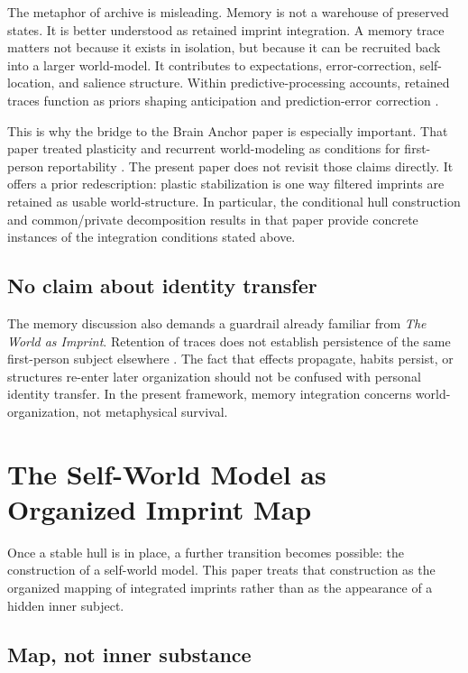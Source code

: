 \documentclass[12pt]{article}
\begin{document}
The metaphor of archive is misleading. Memory is not a warehouse of preserved states. It is better understood as retained imprint integration. A memory trace matters not because it exists in isolation, but because it can be recruited back into a larger world-model. It contributes to expectations, error-correction, self-location, and salience structure. Within predictive-processing accounts, retained traces function as priors shaping anticipation and prediction-error correction \cite{Clark2013}.

This is why the bridge to the Brain Anchor paper is especially important. That paper treated plasticity and recurrent world-modeling as conditions for first-person reportability \cite{BrainAnchor}. The present paper does not revisit those claims directly. It offers a prior redescription: plastic stabilization is one way filtered imprints are retained as usable world-structure. In particular, the conditional hull construction and common/private decomposition results in that paper provide concrete instances of the integration conditions stated above.

\subsection{No claim about identity transfer}

The memory discussion also demands a guardrail already familiar from \emph{The World as Imprint}. Retention of traces does not establish persistence of the same first-person subject elsewhere \cite{WorldImprint}. The fact that effects propagate, habits persist, or structures re-enter later organization should not be confused with personal identity transfer. In the present framework, memory integration concerns world-organization, not metaphysical survival.

\section{The Self-World Model as Organized Imprint Map}

Once a stable hull is in place, a further transition becomes possible: the construction of a self-world model. This paper treats that construction as the organized mapping of integrated imprints rather than as the appearance of a hidden inner subject.

\subsection{Map, not inner substance}
\end{document}

